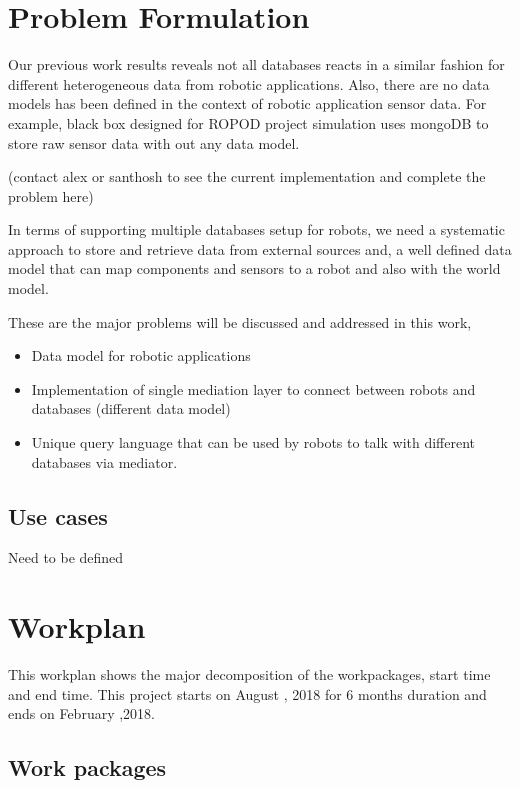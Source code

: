 \documentclass[12pt]{article}
\begin{document}
 

\section{Problem Formulation}

Our previous work results reveals not all databases reacts in a similar fashion for different heterogeneous data from robotic applications. Also, there are no data models has been defined in the context of robotic application sensor data. For example, black box designed for ROPOD project simulation uses mongoDB to store raw sensor data with out any data model. 

(contact alex or santhosh to see the current implementation and complete the problem here)

In terms of supporting multiple databases setup for robots,  we need a systematic approach to store and retrieve data from external sources and, a well defined data model that can map components and sensors to a robot and also with the world model.

These are the major problems will be discussed and addressed in this work,
\begin{itemize}
	\item Data model for robotic applications
	\item Implementation of single mediation layer to connect between robots and databases (different data model)
	\item Unique query language that can be used by robots to talk with different databases via mediator.
\end{itemize}



\subsection{Use cases}
Need to be defined

\section{Workplan}
This workplan shows the major decomposition of the workpackages, start time and end time. This project starts on August , 2018 for 6 months duration and ends on February ,2018.
\newpage
\subsection{Work packages}
\end{document}
